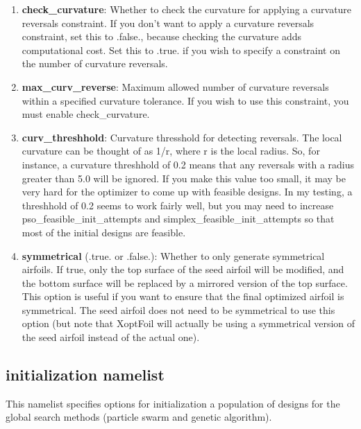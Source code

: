 \documentclass[11pt]{article}
\begin{document}
\begin{enumerate}
{section, which is challenging to build and presents structural problems.  If you don't
want to impose this constraint, just set it to 0.}
\item{\textbf{check\_curvature}: Whether to check the curvature for applying a curvature
reversals constraint.  If you don't want to apply a curvature reversals constraint, set
this to .false., because checking the curvature adds computational cost.  Set this to
.true. if you wish to specify a constraint on the number of curvature reversals.}
\item{\textbf{max\_curv\_reverse}: Maximum allowed number of curvature reversals within a
specified curvature tolerance.  If you wish to use this constraint, you must enable
check\_curvature.}
\item{\textbf{curv\_threshhold}: Curvature thresshold for detecting reversals.  The local
curvature can be thought of as 1/r, where r is the local radius.  So, for instance, a
curvature threshhold of 0.2 means that any reversals with a radius greater than 5.0 will
be ignored.  If you make this value too small, it may be very hard for the optimizer to
come up with feasible designs.  In my testing, a threshhold of 0.2 seems to work fairly
well, but you may need to increase pso\_feasible\_init\_attempts and
simplex\_feasible\_init\_attempts so that most of the initial designs are feasible.}
\item{\textbf{symmetrical} (.true. or .false.): Whether to only generate symmetrical 
airfoils.  If true, only the top surface of the seed airfoil will be modified, and the
bottom surface will be replaced by a mirrored version of the top surface. This option is
useful if you want to ensure that the final optimized airfoil is symmetrical.  The seed 
airfoil does not need
to be symmetrical to use this option (but note that XoptFoil will actually be using a
symmetrical version of the seed airfoil instead of the actual one).}
\end{enumerate}

\subsection{initialization namelist}

This namelist specifies options for initialization a population of designs for the global
search methods (particle swarm and genetic algorithm).
\end{document}
